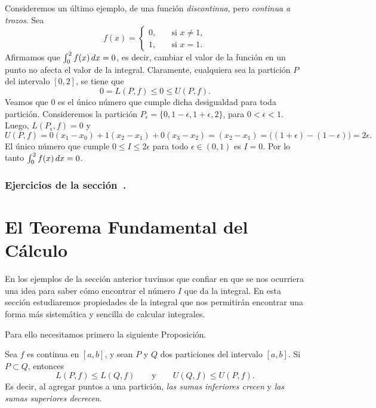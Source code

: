 \begin{example}
  Consideremos un último ejemplo, de una función \emph{discontinua}, pero \emph{continua a trozos}.
  Sea 
  \[
  f(x)=\begin{cases}
    0, \quad&\text{si $x\neq 1$},
    \\
    1, \quad&\text{si $x=1$}.
  \end{cases}
  \]
  Afirmamos que $\int_0^2 f(x)\,dx=0$, es decir, cambiar el valor de la función en un punto no afecta el valor de la integral.
  Claramente, cualquiera sea la partición $P$ del intervalo $[0,2]$, se tiene que 
  \[
  0=L(P,f) \le 0 \le U(P,f).
  \]
  Veamos que $0$ es el único número que cumple dicha desigualdad para toda partición.
  Consideremos la partición $P_\epsilon = \{0, 1-\epsilon, 1+\epsilon, 2\}$, para $0<\epsilon<1$.
  Luego, $L(P_\epsilon,f)=0$ y 
  \[
  U(P,f)=0 (x_1-x_0) + 1 (x_2-x_1) + 0 (x_3-x_2)
  = (x_2-x_1)= \big((1+\epsilon)-(1-\epsilon)\big)=2\epsilon.
  \]
  El único número que cumple $0\le I \le 2\epsilon$ para todo $\epsilon\in(0,1)$ es $I=0$.
  Por lo tanto $\int_0^2 f(x)\,dx=0$.
\end{example}


\subsubsection*{Ejercicios de la sección~.}

\begin{enumerate}

\end{enumerate}


\section{El Teorema Fundamental del Cálculo}

En los ejemplos de la sección anterior tuvimos que confiar en que se nos ocurriera una idea para saber cómo encontrar el número $I$ que da la integral. En esta sección estudiaremos propiedades de la integral que nos permitirán encontrar una forma más sistemática y sencilla de calcular integrales.

Para ello necesitamos primero la siguiente Proposición.

\begin{proposition}
  Sea $f$ es continua en $[a,b]$, y sean $P$ y $Q$ dos particiones del intervalo $[a,b]$.
  Si $P\subset Q$, entonces 
  \[
  L(P,f) \le L(Q,f)
  \qquad\text{y}\qquad
  U(Q,f) \le U(P,f).
  \]
  Es decir, al agregar puntos a una partición, \emph{las sumas inferiores crecen} y \emph{las sumas superiores decrecen}.
\end{proposition}

